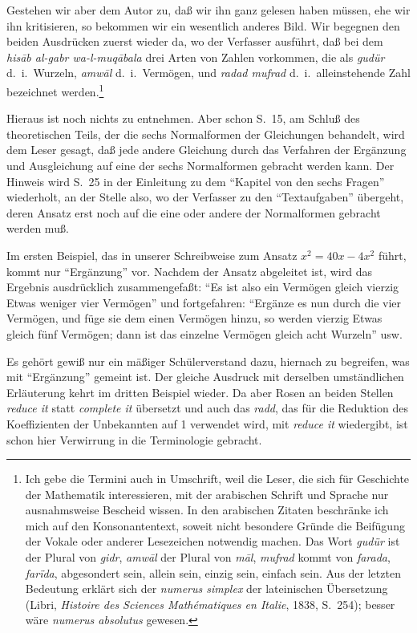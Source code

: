 \documentclass[11pt,a4paper]{article}
\newcommand{\enquote}[1]{``#1''}
\begin{document}
Gestehen wir aber dem Autor zu, da\ss{} wir ihn ganz gelesen haben m\"ussen, ehe wir ihn kritisieren, so bekommen wir ein wesentlich anderes Bild. Wir begegnen den beiden Ausdr\"ucken zuerst wieder da, wo der Verfasser ausf\"uhrt, da\ss{} bei dem \textit{his\=ab al-gabr wa-l-muq\=abala} drei Arten von Zahlen vorkommen, die als \textit{gud\"ur} d.\ i.\ Wurzeln, \textit{amw\=al} d.\ i.\ Verm\"ogen, und \textit{radad mufrad} d.\ i.\ alleinstehende Zahl bezeichnet werden.\footnote{Ich gebe die Termini auch in Umschrift, weil die Leser, die sich f\"ur Geschichte der Mathematik interessieren, mit der arabischen Schrift und Sprache nur ausnahmsweise Bescheid wissen. In den arabischen Zitaten beschr\"anke ich mich auf den Konsonantentext, soweit nicht besondere Gr\"unde die Beif\"ugung der Vokale oder anderer Lesezeichen notwendig machen. Das Wort \textit{gud\"ur} ist der Plural von \textit{gidr}, \textit{amw\=al} der Plural von \textit{m\=al}, \textit{mufrad} kommt von \textit{farada}, \textit{far\"{i}da}, abgesondert sein, allein sein, einzig sein, einfach sein. Aus der letzten Bedeutung erkl\"art sich der \textit{numerus simplex} der lateinischen \"Ubersetzung (Libri, \textit{Histoire des Sciences Math\'ematiques en Italie}, 1838, S.\ 254); besser w\"are \textit{numerus absolutus} gewesen.}

Hieraus ist noch nichts zu entnehmen. Aber schon S.\ 15, am Schlu\ss{} des theoretischen Teils, der die sechs Normalformen der Gleichungen behandelt, wird dem Leser gesagt, da\ss{} jede andere Gleichung durch das Verfahren der Erg\"anzung und Ausgleichung auf eine der sechs Normalformen gebracht werden kann. Der Hinweis wird S.\ 25 in der Einleitung zu dem \enquote{Kapitel von den sechs Fragen} wiederholt, an der Stelle also, wo der Verfasser zu den \enquote{Textaufgaben} \"ubergeht, deren Ansatz erst noch auf die eine oder andere der Normalformen gebracht werden mu\ss{}.

Im ersten Beispiel, das in unserer Schreibweise zum Ansatz $x^{2} = 40x - 4x^{2}$ f\"uhrt, kommt nur \enquote{Erg\"anzung} vor. Nachdem der Ansatz abgeleitet ist, wird das Ergebnis ausdr\"ucklich zusammengefa\ss{}t: \enquote{Es ist also ein Verm\"ogen gleich vierzig Etwas weniger vier Verm\"ogen} und fortgefahren: \enquote{Erg\"anze es nun durch die vier Verm\"ogen, und f\"uge sie dem einen Verm\"ogen hinzu, so werden vierzig Etwas gleich f\"unf Verm\"ogen; dann ist das einzelne Verm\"ogen gleich acht Wurzeln} usw.

Es geh\"ort gewi\ss{} nur ein m\"a\ss{}iger Sch\"ulerverstand dazu, hiernach zu begreifen, was mit \enquote{Erg\"anzung} gemeint ist. Der gleiche Ausdruck mit derselben umst\"andlichen Erl\"auterung kehrt im dritten Beispiel wieder. Da aber Rosen an beiden Stellen \textit{reduce it} statt \textit{complete it} \"ubersetzt und auch das \textit{radd}, das f\"ur die Reduktion des Koeffizienten der Unbekannten auf 1 verwendet wird, mit \textit{reduce it} wiedergibt, ist schon hier Verwirrung in die Terminologie gebracht.
\end{document}
